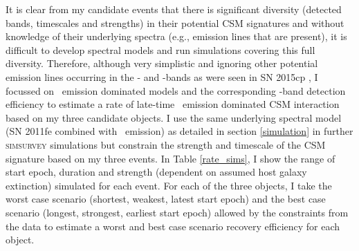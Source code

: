 \documentclass[a4paper,oneside,12pt, class=Latex/Classes/PhDthesisPSnPDF, crop=false]{standalone}
\begin{document}
It is clear from my candidate events that there is significant diversity (detected bands, timescales and strengths) in their potential CSM signatures and without knowledge of their underlying spectra (e.g., emission lines that are present), it is difficult to develop spectral models and run simulations covering this full diversity. Therefore, although very simplistic and ignoring other potential emission lines occurring in the \ztfg- and \ztfi-bands as were seen in SN 2015cp \citep{2015cp}, I focussed on \Halpha~emission dominated models and the corresponding \ztfr-band detection efficiency to estimate a rate of late-time \Halpha~emission dominated CSM interaction based on my three candidate objects. I use the same underlying spectral model (SN 2011fe combined with \Halpha~emission) as detailed in section \ref{simulation} in further \textsc{simsurvey} simulations but constrain the strength and timescale of the CSM signature based on my three events. In Table \ref{rate_sims}, I show the range of start epoch, duration and strength (dependent on assumed host galaxy extinction) simulated for each event. For each of the three objects, I take the worst case scenario (shortest, weakest, latest start epoch) and the best case scenario (longest, strongest, earliest start epoch) allowed by the constraints from the data to estimate a worst and best case scenario recovery efficiency for each object.
\end{document}
